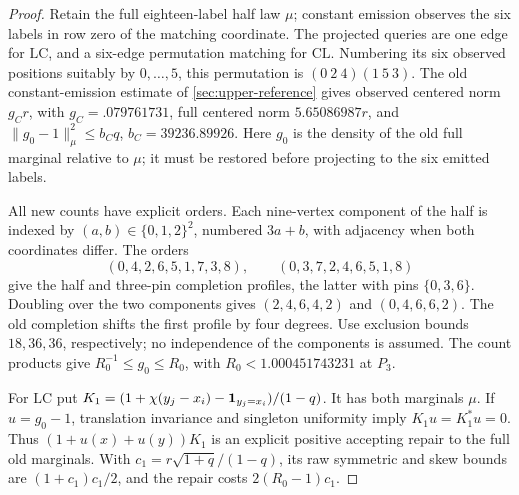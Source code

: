 \begin{proof}
Retain the full eighteen-label half law $\mu$; constant emission
observes the six labels in row zero of the matching coordinate.
The projected queries are one edge for $\mathrm{LC}$, and a
six-edge permutation matching for $\mathrm{CL}$. Numbering its
six observed positions suitably by $0,\ldots,5$, this permutation is
$(0\ 2\ 4)(1\ 5\ 3)$.
The old constant-emission estimate of \cref{sec:upper-reference} gives
observed centered norm $g_Cr$, with $g_C=.079761731$, full centered
norm $5.65086987r$, and
$\|g_0-1\|_\mu^2\le b_Cq$, $b_C=39236.89926$.
Here $g_0$ is the density of the old full marginal relative to $\mu$;
it must be restored before projecting to the six emitted labels.

All new counts have explicit orders. Each nine-vertex component of
the half is indexed by $(a,b)\in\{0,1,2\}^2$, numbered $3a+b$,
with adjacency when both coordinates differ. The orders
\[
 (0,4,2,6,5,1,7,3,8),\qquad(0,3,7,2,4,6,5,1,8)
\]
give the half and three-pin completion profiles, the latter with pins
$\{0,3,6\}$. Doubling over the two components gives
$(2,4,6,4,2)$ and $(0,4,6,6,2)$.
The old completion shifts the first profile by four degrees.
Use exclusion bounds $18,36,36$, respectively; no independence of
the components is assumed. The count products give
$R_0^{-1}\le g_0\le R_0$, with $R_0<1.000451743231$ at $P_3$.

For $\mathrm{LC}$ put
$K_1=(1+\chi(y_j-x_i)-\mathbf 1_{y_j=x_i})/(1-q)$.
It has both marginals $\mu$. If $u=g_0-1$, translation invariance
and singleton uniformity imply $K_1u=K_1^*u=0$.
Thus $(1+u(x)+u(y))K_1$ is an explicit positive accepting repair to
the full old marginals. With
$c_1=r\sqrt{1+q}/(1-q)$, its raw symmetric and skew bounds are
$(1+c_1)c_1/2$, and the repair costs $2(R_0-1)c_1$.


\end{proof}
